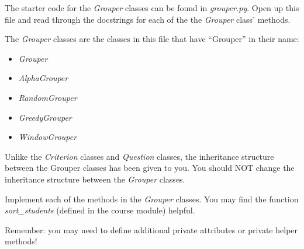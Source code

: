 \documentclass[12pt]{article}
\begin{document}
\bigskip

\noindent The starter code for the \textit{Grouper} classes can be found in
\textit{grouper.py}. Open up this file and read through the docstrings for each
of the the \textit{Grouper} class’ methods.

\bigskip

\noindent The \textit{Grouper} classes are the classes in this file that have
“Grouper” in their name:

\begin{itemize}
    \item \textit{Grouper}
    \item \textit{AlphaGrouper}
    \item \textit{RandomGrouper}
    \item \textit{GreedyGrouper}
    \item \textit{WindowGrouper}
\end{itemize}

\noindent Unlike the \textit{Criterion} classes and \textit{Question} classes, the
inheritance structure between the Grouper classes has been given to you. You
should NOT change the inheritance structure between the \textit{Grouper} classes.

\bigskip

\noindent Implement each of the methods in the \textit{Grouper} classes. You may
find the function \textit{sort\_students} (defined in the course module) helpful.

\bigskip

\noindent Remember: you may need to define additional private attributes or private
helper methods!

\bigskip
\end{document}
